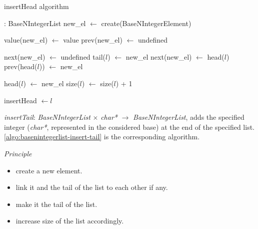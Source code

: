 \documentclass[book, nodocumentinfo]{upmethodology-document}
\begin{document}
\begin{algorithm}[H]
    \label{algo:basenintegerlist-insert-head}
    \caption{insertHead algorithm}

    \begin{algorithmic}
         : BaseNIntegerList
            \State new\_el \(\leftarrow\) create(BaseNIntegerElement)

            \State value(new\_el) \(\leftarrow\) value
            \State prev(new\_el) \(\leftarrow\) undefined

                \State next(new\_el) \(\leftarrow\) undefined
                \State tail(\(l\)) \(\leftarrow\) new\_el
            \Else
                \State next(new\_el) \(\leftarrow\) head(\(l\))
                \State prev(head(\(l\))) \(\leftarrow\) new\_el
            \EndIf

            \State head(\(l\)) \(\leftarrow\) new\_el
            \State size(\(l\)) \(\leftarrow\) size(\(l\)) + 1

            \State insertHead \(\leftarrow l\)
        \EndFunction
    \end{algorithmic}
\end{algorithm}


\emph{insertTail}: \emph{BaseNIntegerList} \(\times\) \emph{char*} \(\rightarrow\) \emph{BaseNIntegerList},
adds the specified integer (\emph{char*}, represented in the considered base) at the end
of the specified list.
\ref{algo:basenintegerlist-insert-tail} is the corresponding algorithm.

\emph{Principle}
\begin{itemize}
    \item create a new element.
    \item link it and the tail of the list to each other if any.
    \item make it the tail of the list.
    \item increase size of the list accordingly.
\end{itemize}
\end{document}
